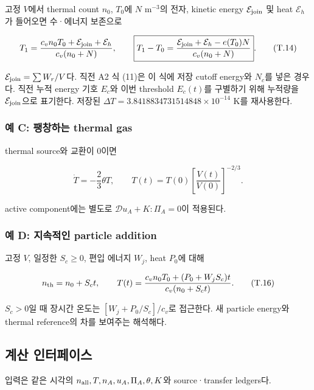 고정 \(V\)에서 thermal count \(n_0\), \(T_0\)에 \(N\) m\(^{-3}\)의 전자, kinetic energy \(\mathcal E_{\rm join}\) 및 heat \(\mathcal E_h\)가 들어오면 수·에너지 보존으로

\[
T_1=\frac{c_vn_0T_0+\mathcal E_{\rm join}+\mathcal E_h}{c_v(n_0+N)},
\qquad
\boxed{T_1-T_0=
\frac{\mathcal E_{\rm join}+\mathcal E_h-e(T_0)N}{c_v(n_0+N)}}.
\tag{T.14}
\]

\(\mathcal E_{\rm join}=\sum W_r/V\)다. 직전 A2 식 (11)은 이 식에 저장 cutoff energy와 \(N_c\)를 넣은 경우다. 직전 누적 energy 기호 \(E_c\)와 이번 threshold \(E_c(t)\)를 구별하기 위해 누적량을 \(\mathcal E_{\rm join}\)으로 표기한다. 저장된 \(\Delta T=3.8418834731514848\times10^{-14}\) K를 재사용한다.

\hypertarget{uxc608-c-uxd33duxcc3duxd558uxb294-thermal-gas}{%
\subsubsection{예 C: 팽창하는 thermal gas}\label{uxc608-c-uxd33duxcc3duxd558uxb294-thermal-gas}}

thermal source와 교환이 0이면

\[
\dot T=-\frac23\theta T,\qquad
T(t)=T(0)\left[\frac{V(t)}{V(0)}\right]^{-2/3}.
\tag{T.15}
\]

active component에는 별도로 \(\mathcal D u_A+K:\Pi_A=0\)이 적용된다.

\hypertarget{uxc608-d-uxc9c0uxc18duxc801uxc778-particle-addition}{%
\subsubsection{예 D: 지속적인 particle addition}\label{uxc608-d-uxc9c0uxc18duxc801uxc778-particle-addition}}

고정 \(V\), 일정한 \(S_c\ge0\), 편입 에너지 \(W_j\), heat \(P_0\)에 대해

\[
n_{\rm th}=n_0+S_ct,\qquad
T(t)=\frac{c_vn_0T_0+(P_0+W_jS_c)t}{c_v(n_0+S_ct)}.
\tag{T.16}
\]

\(S_c>0\)일 때 장시간 온도는 \([W_j+P_0/S_c]/c_v\)로 접근한다. 새 particle energy와 thermal reference의 차를 보여주는 해석해다.

\hypertarget{uxacc4uxc0b0-uxc778uxd130uxd398uxc774uxc2a4}{%
\subsection{계산 인터페이스}\label{uxacc4uxc0b0-uxc778uxd130uxd398uxc774uxc2a4}}

입력은 같은 시각의 \(n_{\rm all},T,n_A,u_A,\Pi_A,\theta,K\)와 source·transfer ledgers다.

